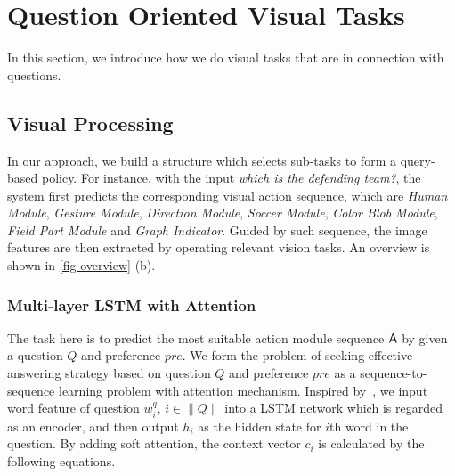 \section{Question Oriented Visual Tasks}
\label{sec-reinforcement-learning}
In this section, we introduce how we do visual tasks that are in connection with questions. 




\subsection{Visual Processing}

In our approach, we build a structure which selects sub-tasks to form a query-based policy. For instance, with the input \textit{which is the defending team?}, the system first predicts the corresponding visual action sequence, which are \textit{Human Module}, \textit{Gesture Module}, \textit{Direction Module}, \textit{Soccer Module}, \textit{Color Blob Module}, \textit{Field Part Module} and \textit{Graph Indicator}. Guided by such sequence, the image features are then extracted by operating relevant vision tasks. An overview is shown in \cref{fig-overview} (b).  %

\label{sec-visual-processing}

\subsubsection{Multi-layer LSTM with Attention}
\label{sec-LSTM}
\hspace{\parindent}The task here is to predict the most suitable action module sequence ${\mathsf{A}}$ by given a question $Q$ and preference $pre$. We form the problem of seeking effective answering strategy based on question $Q$ and preference $pre$ as a sequence-to-sequence learning problem with attention mechanism. Inspired by~\cite{Bahdanau2016}, we input word feature of question $w_i^q$, $i\in\|Q\|$ into a LSTM network which is regarded as an encoder, and then output $h_i$ as the hidden state for $i$th word in the question. By adding soft attention, the context vector $c_i$ is calculated by the following equations.


